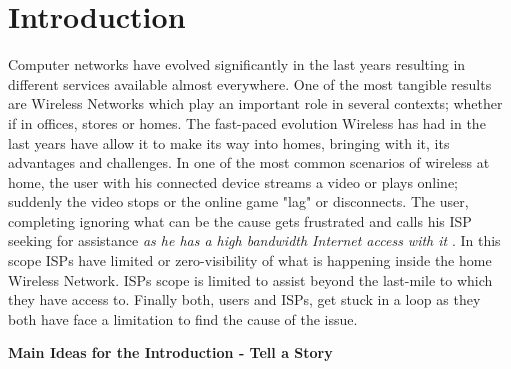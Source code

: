 \section{Introduction}\label{Introduction}


Computer networks have evolved significantly in the last years resulting in different services available almost everywhere. One of the most tangible results are Wireless Networks which play an important role in several contexts; whether if in offices, stores or homes. The fast-paced  evolution Wireless has had in the last years have allow it to make its way into homes, bringing with it, its advantages and challenges. In one of the most common scenarios of wireless at home, the user with his connected device streams a video or plays online; suddenly the video stops or the online game "lag" or disconnects. The user, completing ignoring what can be the cause gets frustrated and calls his ISP seeking for assistance \emph{as he has a high bandwidth Internet access with it} . In this scope ISPs have limited or zero-visibility of what is happening inside the home Wireless Network. ISPs scope is limited to assist beyond the last-mile to which they have access to. Finally both, users and ISPs, get stuck in a loop as they both have face a limitation to find the cause of the issue.


\textbf{Main Ideas for the Introduction - Tell a Story}

